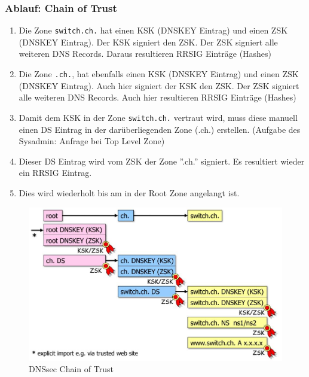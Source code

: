\subsubsection{Ablauf: Chain of Trust}
\begin{enumerate}
	\item Die Zone \lstinline|switch.ch.| hat einen KSK (DNSKEY Eintrag) und einen ZSK (DNSKEY Eintrag). Der KSK signiert den ZSK. Der ZSK signiert alle weiteren DNS Records. Daraus resultieren RRSIG Einträge (Hashes)
	\item Die Zone \lstinline|.ch.|, hat ebenfalls einen KSK (DNSKEY Eintrag) und einen ZSK (DNSKEY Eintrag). Auch hier signiert der KSK den ZSK. Der ZSK signiert alle weiteren DNS Records. Auch hier resultieren RRSIG Einträge (Hashes)
	\item Damit dem KSK in der Zone \lstinline|switch.ch.| vertraut wird, muss diese manuell einen DS Eintrag in der darüberliegenden Zone (.ch.) erstellen. (Aufgabe des Sysadmin: Anfrage bei Top Level Zone)
	\item Dieser DS Eintrag wird vom ZSK der Zone ''.ch.'' signiert. Es resultiert wieder ein RRSIG Eintrag.
	\item Dies wird wiederholt bis am in der Root Zone angelangt ist.
\end{enumerate}

\begin{figure}[h!]
	\centering
	\includegraphics[width=0.9\linewidth]{images/dnssec_chainoftrust}
	\caption{DNSsec Chain of Trust}
	\label{fig:dnssecchainoftrust}
\end{figure}


